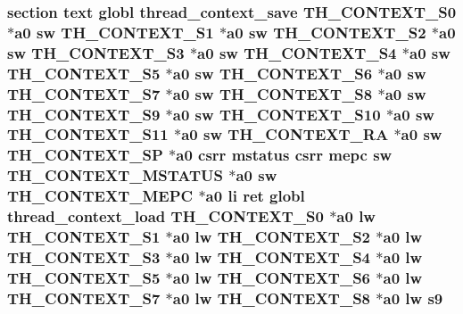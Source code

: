 \hypertarget{riscv_2kpanica_8S_ac1f5771f3c7310de604f84b9d9aeb30e}{
\subsubsection[{s9}]{\setlength{\rightskip}{0pt plus 5cm}section text globl {\bf thread\-\_\-context\-\_\-save} {\bf T\-H\-\_\-\-C\-O\-N\-T\-E\-X\-T\-\_\-\-S0} $\ast${\bf a0} {\bf sw} {\bf T\-H\-\_\-\-C\-O\-N\-T\-E\-X\-T\-\_\-\-S1} $\ast${\bf a0} {\bf sw} {\bf T\-H\-\_\-\-C\-O\-N\-T\-E\-X\-T\-\_\-\-S2} $\ast${\bf a0} {\bf sw} {\bf T\-H\-\_\-\-C\-O\-N\-T\-E\-X\-T\-\_\-\-S3} $\ast${\bf a0} {\bf sw} {\bf T\-H\-\_\-\-C\-O\-N\-T\-E\-X\-T\-\_\-\-S4} $\ast${\bf a0} {\bf sw} {\bf T\-H\-\_\-\-C\-O\-N\-T\-E\-X\-T\-\_\-\-S5} $\ast${\bf a0} {\bf sw} {\bf T\-H\-\_\-\-C\-O\-N\-T\-E\-X\-T\-\_\-\-S6} $\ast${\bf a0} {\bf sw} {\bf T\-H\-\_\-\-C\-O\-N\-T\-E\-X\-T\-\_\-\-S7} $\ast${\bf a0} {\bf sw} {\bf T\-H\-\_\-\-C\-O\-N\-T\-E\-X\-T\-\_\-\-S8} $\ast${\bf a0} {\bf sw} {\bf T\-H\-\_\-\-C\-O\-N\-T\-E\-X\-T\-\_\-\-S9} $\ast${\bf a0} {\bf sw} {\bf T\-H\-\_\-\-C\-O\-N\-T\-E\-X\-T\-\_\-\-S10} $\ast${\bf a0} {\bf sw} {\bf T\-H\-\_\-\-C\-O\-N\-T\-E\-X\-T\-\_\-\-S11} $\ast${\bf a0} {\bf sw} {\bf T\-H\-\_\-\-C\-O\-N\-T\-E\-X\-T\-\_\-\-R\-A} $\ast${\bf a0} {\bf sw} {\bf T\-H\-\_\-\-C\-O\-N\-T\-E\-X\-T\-\_\-\-S\-P} $\ast${\bf a0} csrr {\bf mstatus} csrr {\bf mepc} {\bf sw} {\bf T\-H\-\_\-\-C\-O\-N\-T\-E\-X\-T\-\_\-\-M\-S\-T\-A\-T\-U\-S} $\ast${\bf a0} {\bf sw} {\bf T\-H\-\_\-\-C\-O\-N\-T\-E\-X\-T\-\_\-\-M\-E\-P\-C} $\ast${\bf a0} {\bf li} ret globl {\bf thread\-\_\-context\-\_\-load} {\bf T\-H\-\_\-\-C\-O\-N\-T\-E\-X\-T\-\_\-\-S0} $\ast${\bf a0} {\bf lw} {\bf T\-H\-\_\-\-C\-O\-N\-T\-E\-X\-T\-\_\-\-S1} $\ast${\bf a0} {\bf lw} {\bf T\-H\-\_\-\-C\-O\-N\-T\-E\-X\-T\-\_\-\-S2} $\ast${\bf a0} {\bf lw} {\bf T\-H\-\_\-\-C\-O\-N\-T\-E\-X\-T\-\_\-\-S3} $\ast${\bf a0} {\bf lw} {\bf T\-H\-\_\-\-C\-O\-N\-T\-E\-X\-T\-\_\-\-S4} $\ast${\bf a0} {\bf lw} {\bf T\-H\-\_\-\-C\-O\-N\-T\-E\-X\-T\-\_\-\-S5} $\ast${\bf a0} {\bf lw} {\bf T\-H\-\_\-\-C\-O\-N\-T\-E\-X\-T\-\_\-\-S6} $\ast${\bf a0} {\bf lw} {\bf T\-H\-\_\-\-C\-O\-N\-T\-E\-X\-T\-\_\-\-S7} $\ast${\bf a0} {\bf lw} {\bf T\-H\-\_\-\-C\-O\-N\-T\-E\-X\-T\-\_\-\-S8} $\ast${\bf a0} {\bf lw} s9}}\label{riscv_2kpanica_8S_ac1f5771f3c7310de604f84b9d9aeb30e}
